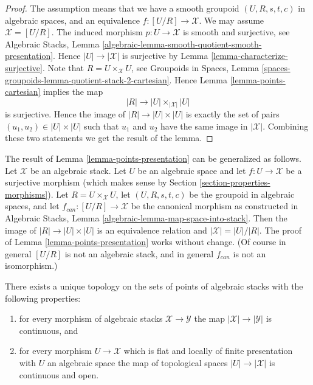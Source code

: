 \begin{proof}
The assumption means that we have a smooth groupoid $(U, R, s, t, c)$
in algebraic spaces, and an equivalence $f : [U/R] \to \mathcal{X}$.
We may assume $\mathcal{X} = [U/R]$.
The induced morphism $p : U \to \mathcal{X}$ is smooth and surjective, see
Algebraic Stacks,
Lemma \ref{algebraic-lemma-smooth-quotient-smooth-presentation}.
Hence $|U| \to |\mathcal{X}|$ is surjective by
Lemma \ref{lemma-characterize-surjective}.
Note that $R = U \times_{\mathcal{X}} U$, see
Groupoids in Spaces,
Lemma \ref{spaces-groupoids-lemma-quotient-stack-2-cartesian}.
Hence
Lemma \ref{lemma-points-cartesian}
implies the map
$$
|R| \longrightarrow |U| \times_{|\mathcal{X}|} |U|
$$
is surjective. Hence the image of $|R| \to |U| \times |U|$ is
exactly the set of pairs $(u_1, u_2) \in |U| \times |U|$
such that $u_1$ and $u_2$ have the same image in $|\mathcal{X}|$.
Combining these two statements we get the result of the lemma.
\end{proof}

\begin{remark}
\label{remark-more-general-presentation}
The result of
Lemma \ref{lemma-points-presentation}
can be generalized as follows.
Let $\mathcal{X}$ be an algebraic stack.
Let $U$ be an algebraic space and let $f : U \to \mathcal{X}$ be a surjective
morphism (which makes sense by
Section \ref{section-properties-morphisms}).
Let $R = U \times_{\mathcal{X}} U$, let $(U, R, s, t, c)$ be the groupoid
in algebraic spaces, and let $f_{can} : [U/R] \to \mathcal{X}$ be the
canonical morphism as constructed in
Algebraic Stacks, Lemma \ref{algebraic-lemma-map-space-into-stack}.
Then the image of $|R| \to |U| \times |U|$ is an equivalence relation
and $|\mathcal{X}| = |U|/|R|$. The proof of
Lemma \ref{lemma-points-presentation}
works without change. (Of course in general $[U/R]$ is not an algebraic
stack, and in general $f_{can}$ is not an isomorphism.)
\end{remark}

\begin{lemma}
\label{lemma-topology-points}
There exists a unique topology on the sets of points
of algebraic stacks with the following properties:
\begin{enumerate}
\item for every morphism of algebraic stacks $\mathcal{X} \to \mathcal{Y}$
the map $|\mathcal{X}| \to |\mathcal{Y}|$ is continuous, and
\item for every morphism $U \to \mathcal{X}$ which is flat and locally
of finite presentation with $U$ an algebraic space
the map of topological spaces $|U| \to |\mathcal{X}|$ is continuous and open.
\end{enumerate}
\end{lemma}

